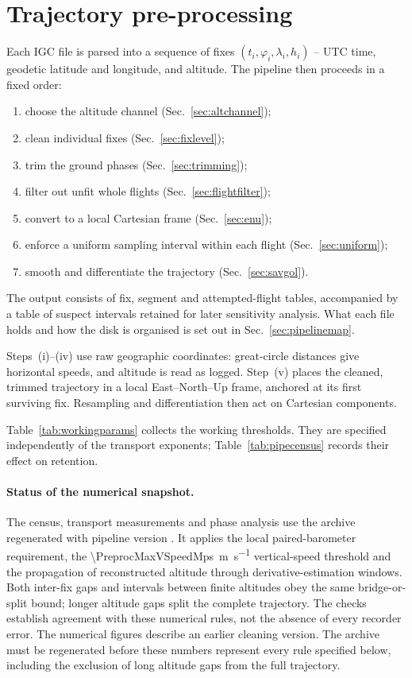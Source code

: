 \section{Trajectory pre-processing}
\label{sec:preproc}
Each IGC file is parsed into a sequence of fixes $(t_i,\varphi_i,\lambda_i,h_i)$ -- UTC
time, geodetic latitude and longitude, and altitude. The pipeline then proceeds in a fixed order:
\begin{enumerate}[label=(\roman*), itemsep=1pt, topsep=3pt]
  \item choose the altitude channel (Sec.~\ref{sec:altchannel});
  \item clean individual fixes (Sec.~\ref{sec:fixlevel});
  \item trim the ground phases (Sec.~\ref{sec:trimming});
  \item filter out unfit whole flights (Sec.~\ref{sec:flightfilter});
  \item convert to a local Cartesian frame (Sec.~\ref{sec:enu});
  \item enforce a uniform sampling interval within each flight (Sec.~\ref{sec:uniform});
  \item smooth and differentiate the trajectory (Sec.~\ref{sec:savgol}).
\end{enumerate}
The output consists of fix, segment and attempted-flight tables, accompanied by a
table of suspect intervals retained for later sensitivity analysis. What each file holds and how the disk is organised is set out in
Sec.~\ref{sec:pipelinemap}.

Steps~(i)--(iv) use raw geographic coordinates: great-circle distances give horizontal
speeds, and altitude is read as logged. Step~(v) places the cleaned, trimmed trajectory
in a local East--North--Up frame, anchored at its first surviving fix. Resampling and
differentiation then act on Cartesian components.

Table~\ref{tab:workingparams} collects the working thresholds. They are specified
independently of the transport exponents; Table~\ref{tab:pipecensus} records their
effect on retention.

\paragraph{Status of the numerical snapshot.}
\ifnum{}
The census, transport measurements and phase analysis use the archive regenerated with
pipeline version \StatSnapshotVersion. It applies the local paired-barometer requirement,
the \SI{\PreprocMaxVSpeedMps}{\metre\per\second} vertical-speed threshold and the
propagation of reconstructed altitude through derivative-estimation windows.
Both inter-fix gaps and intervals between finite altitudes obey the same
bridge-or-split bound; longer altitude gaps split the complete trajectory. The
checks establish agreement with these numerical rules, not the absence of every recorder error.
\else
The numerical figures describe an earlier cleaning version. The archive must be
regenerated before these numbers represent every rule specified below, including
the exclusion of long altitude gaps from the full trajectory.

